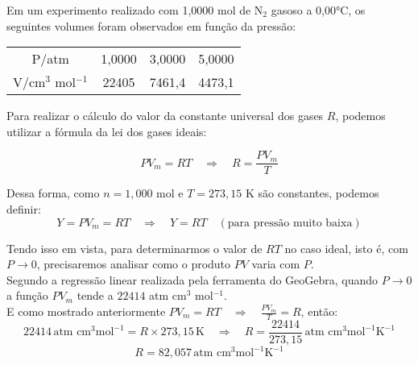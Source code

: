 \begin{xcs}
    Em um experimento realizado com 1,0000 mol de N\(_2\) gasoso a 0,00°C, os
    seguintes volumes foram observados em função da pressão: 
    \begin{center}
    \begin{tabular}{c | c c c}
    \hline
        P/atm & 1,0000 & 3,0000 & 5,0000\\
        V/cm\(^3\) mol\(^{-1}\) & 22405 & 7461,4 & 4473,1\\
    \hline
    \end{tabular}
    \end{center}
\end{xcs}
\begin{rsl}


     Para realizar o cálculo do valor da constante universal dos gases \( R \), podemos utilizar a fórmula da lei dos gases ideais: 
    
    \[ PV_m = RT \quad \Rightarrow \quad R = \frac{PV_m}{T} \]
    
    Dessa forma, como \( n = 1,000 \) mol e \( T = 273,15 \) K são constantes, podemos definir:
    \[Y = PV_m = RT \quad \Rightarrow \quad Y = RT \quad (\text{para pressão muito baixa})\]
    
    Tendo isso em vista, para determinarmos o valor de \( RT \) no caso ideal, 
    isto é, com \( P \to 0 \), precisaremos analisar como o produto \( PV \) varia com \( P \). \\
    
    Segundo a regressão linear realizada pela ferramenta do GeoGebra, quando \( P \to 0 \) a função \( PV_m \) tende a \( 22414 \) atm cm\(^3\) mol\(^{-1}\). \\
    
    E como mostrado anteriormente \( PV_m = RT \quad \Rightarrow \quad \frac{PV_m}{T} = R \), então:
    \[22414 \, \text{atm cm}^3 \text{mol}^{-1} = R \times 273,15 \, \text{K} \quad \Rightarrow \quad R = \frac{22414}{273,15} \, \text{atm cm}^3 \text{mol}^{-1} \text{K}^{-1}\]
    \[R = 82,057 \, \text{atm cm}^3 \text{mol}^{-1} \text{K}^{-1}\]

\end{rsl}

